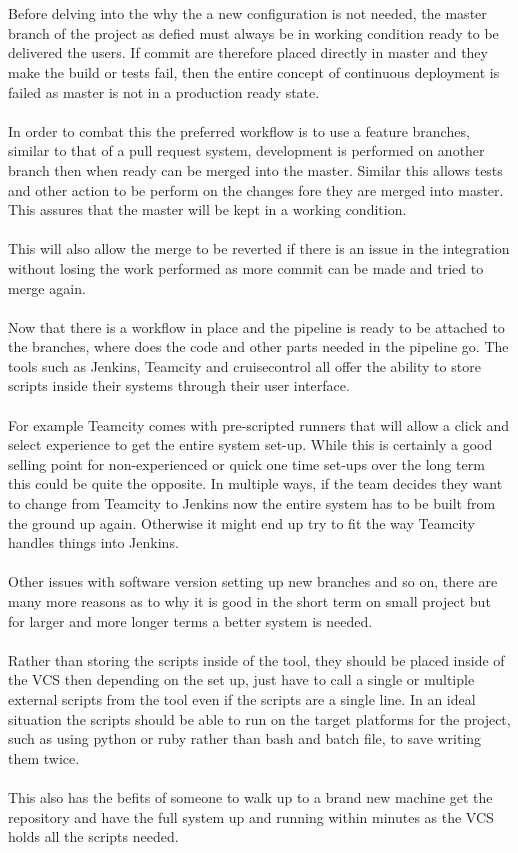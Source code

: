 \\\\
Before delving into the why the a new configuration is not needed, the master branch of the project as defied must always be in working condition ready to be delivered the users. If commit are therefore placed directly in master and they make the build or tests fail, then the entire concept of continuous deployment is failed as master is not in a  production ready state.
\\\\
In order to combat this the preferred workflow is to use a feature branches, similar to that of a pull request system, development is performed on another branch then when ready can be merged into the master. Similar this allows tests and other action to be perform on the changes fore they are merged into master. This assures that the master will be kept in a working condition.
\\\\
This will also allow the merge to be reverted if there is an issue in the integration without losing the work performed as more commit can be made and tried to merge again.
\\\\
Now that there is a workflow in place and the pipeline is ready to be attached to the branches, where does the code and other parts needed in the pipeline go. The tools such as Jenkins, Teamcity and cruisecontrol all offer the ability to store scripts inside their systems through their user interface.
\\\\
For example Teamcity comes with pre-scripted runners that will allow a click and select experience to get the entire system set-up. While this is certainly a good selling point for non-experienced or quick one time set-ups over the long term this could be quite the opposite. In multiple ways, if the team decides they want to change from Teamcity to Jenkins now the entire system has to be built from the ground up again. Otherwise it might end up try to fit the way Teamcity handles things into Jenkins.
\\\\
Other issues with software version setting up new branches and so on, there are many more reasons as to why it is good in the short term on small project but for larger and more longer terms a better system is needed.
\\\\
Rather than storing the scripts inside of the tool, they should be placed inside of the VCS then depending on the set up, just have to call a single or multiple external scripts from the tool even if the scripts are a single line. In an ideal situation the scripts should be able to run on the target platforms for the project, such as using python or ruby rather than bash and batch file, to save writing them twice.
\\\\
This also has the befits of someone to walk up to a brand new machine get the repository and have the full system up and running within minutes as the VCS holds all the scripts needed.

